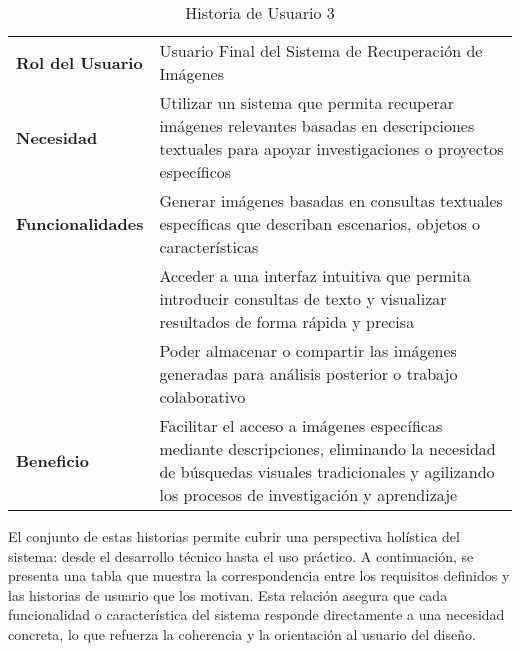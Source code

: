 \begin{table}[ht]
    \centering
    \renewcommand{\arraystretch}{1.5}
    \begin{tabular}{|>{\columncolor{gray!10}}p{4cm}|p{10cm}|}
        \hline
        \rowcolor{gray!30}
        \multicolumn{2}{|c|}{\textbf{Historia de Usuario 3}} \\
        \hline
        \textbf{Rol del Usuario} & Usuario Final del Sistema de Recuperación de Imágenes \\
        \hline
        \textbf{Necesidad} & Utilizar un sistema que permita recuperar imágenes relevantes basadas en descripciones textuales para apoyar investigaciones o proyectos específicos \\
        \hline
        \textbf{Funcionalidades} & Generar imágenes basadas en consultas textuales específicas que describan escenarios, objetos o características
        \\ & Acceder a una interfaz intuitiva que permita introducir consultas de texto y visualizar resultados de forma rápida y precisa
        \\ & Poder almacenar o compartir las imágenes generadas para análisis posterior o trabajo colaborativo \\
        \hline
        \textbf{Beneficio} & Facilitar el acceso a imágenes específicas mediante descripciones, eliminando la necesidad de búsquedas visuales tradicionales y agilizando los procesos de investigación y aprendizaje \\
        \hline
    \end{tabular}
    \caption{Historia de Usuario 3}
    \label{tab:hu03}
\end{table}

El conjunto de estas historias permite cubrir una perspectiva holística del sistema: desde el desarrollo técnico hasta el uso práctico. A continuación, se presenta una tabla que muestra la correspondencia entre los requisitos definidos y las historias de usuario que los motivan. Esta relación asegura que cada funcionalidad o característica del sistema responde directamente a una necesidad concreta, lo que refuerza la coherencia y la orientación al usuario del diseño.



